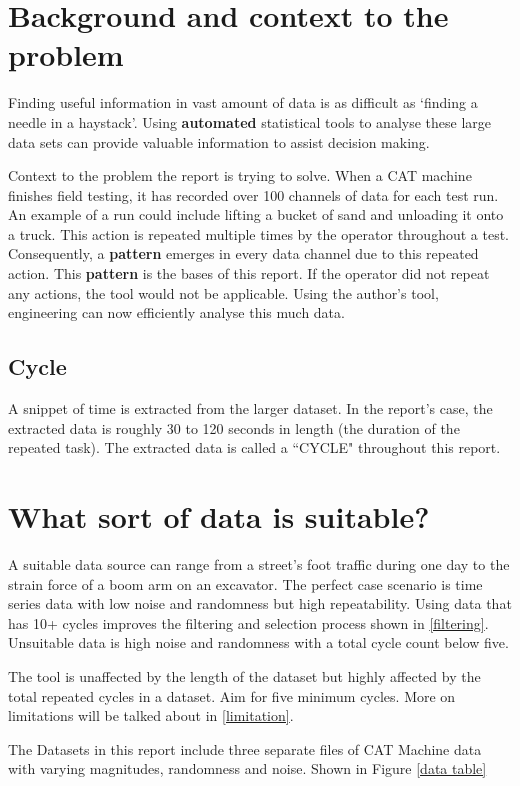 \raggedright
\section{Background and context to the problem}
Finding useful information in vast amount of data is as difficult as `finding a needle in a haystack'. Using \textbf{automated} statistical tools to analyse these large data sets can provide valuable information to assist decision making.

Context to the problem the report is trying to solve. When a CAT machine finishes field testing, it has recorded over 100 channels of data for each test run. An example of a run could include lifting a bucket of sand and unloading it onto a truck. This action is repeated multiple times by the operator throughout a test. Consequently, a \textbf{pattern} emerges in every data channel due to this repeated action. This \textbf{pattern} is the bases of this report. If the operator did not repeat any actions, the tool would not be applicable. 
Using the author's tool, engineering can now efficiently analyse this much data. 

\subsection{Cycle}
A snippet of time is extracted from the larger dataset. In the report's case, the extracted data is roughly 30 to 120 seconds in length (the duration of the repeated task). The extracted data is called a ``CYCLE" throughout this report.

\section{What sort of data is suitable?}
A suitable data source can range from a street's foot traffic during one day to the strain force of a boom arm on an excavator. 
The perfect case scenario is time series data with low noise and randomness but high repeatability. Using data that has 10+ cycles improves the filtering and selection process shown in \ref{filtering}. Unsuitable data is high noise and randomness with a total cycle count below five. 

The tool is unaffected by the length of the dataset but highly affected by the total repeated cycles in a dataset. Aim for five minimum cycles. More on limitations will be talked about in \ref{limitation}.

The Datasets in this report include three separate files of CAT Machine data with varying magnitudes, randomness and noise. Shown in Figure \ref{data table}

